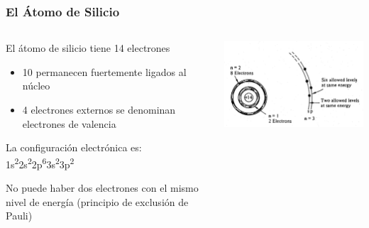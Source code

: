 \documentclass[10pt,t,aspectratio=169]{beamer}
\begin{document}
\begin{frame}[t]
  \frametitle{El Átomo de Silicio}

  \begin{columns}
  
    \begin{column}{0.6\textwidth}
    
      El átomo de silicio tiene 14 electrones
      
      \begin{itemize}
        \item 10 permanecen fuertemente ligados al núcleo
        \item 4 electrones externos se denominan electrones de valencia
      \end{itemize}

      \vspace{3mm}
      La configuración electrónica es: 1s\textsuperscript{2}2s\textsuperscript{2}2p\textsuperscript{6}3s\textsuperscript{2}3p\textsuperscript{2}

      \vspace{3mm}
      No puede haber dos electrones con el mismo nivel de energía (principio de exclusión de Pauli)
      
    \end{column}
    
    \begin{column}{0.4\textwidth}
    
      \includegraphics[width=\textwidth]{./figures/atom-silicon.png}
      
    \end{column}
    
  \end{columns}
  
\end{frame}
\end{document}
